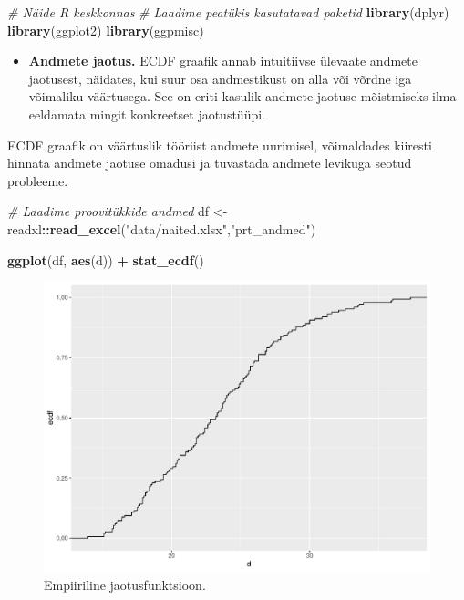 \documentclass[
]{book}
\newenvironment{Shaded}{\begin{snugshade}}{\end{snugshade}}
\newcommand{\CommentTok}[1]{\textcolor[rgb]{0.56,0.35,0.01}{\textit{#1}}}
\newcommand{\FunctionTok}[1]{\textcolor[rgb]{0.13,0.29,0.53}{\textbf{#1}}}
\newcommand{\NormalTok}[1]{#1}
\newcommand{\OtherTok}[1]{\textcolor[rgb]{0.56,0.35,0.01}{#1}}
\newcommand{\SpecialCharTok}[1]{\textcolor[rgb]{0.81,0.36,0.00}{\textbf{#1}}}
\newcommand{\StringTok}[1]{\textcolor[rgb]{0.31,0.60,0.02}{#1}}
\providecommand{\tightlist}{%
  \setlength{\itemsep}{0pt}\setlength{\parskip}{0pt}}
\renewenvironment{Shaded} {\begin{snugshade}\footnotesize} {\end{snugshade}}
\begin{document}
\begin{Shaded}
\begin{Highlighting}[]
\CommentTok{\# Näide R keskkonnas}
\CommentTok{\# Laadime peatükis kasutatavad paketid}
\FunctionTok{library}\NormalTok{(dplyr)}
\FunctionTok{library}\NormalTok{(ggplot2)}
\FunctionTok{library}\NormalTok{(ggpmisc)}
\end{Highlighting}
\end{Shaded}

\begin{itemize}
\tightlist
\item
  \textbf{Andmete jaotus.} ECDF graafik annab intuitiivse ülevaate andmete jaotusest, näidates, kui suur osa andmestikust on alla või võrdne iga võimaliku väärtusega. See on eriti kasulik andmete jaotuse mõistmiseks ilma eeldamata mingit konkreetset jaotustüüpi.
\end{itemize}

ECDF graafik on väärtuslik tööriist andmete uurimisel, võimaldades kiiresti hinnata andmete jaotuse omadusi ja tuvastada andmete levikuga seotud probleeme.

\begin{Shaded}
\begin{Highlighting}[]
\CommentTok{\# Laadime proovitükkide andmed}
\NormalTok{df }\OtherTok{\textless{}{-}}\NormalTok{ readxl}\SpecialCharTok{::}\FunctionTok{read\_excel}\NormalTok{(}\StringTok{"data/naited.xlsx"}\NormalTok{,}\StringTok{"prt\_andmed"}\NormalTok{)}

\FunctionTok{ggplot}\NormalTok{(df, }\FunctionTok{aes}\NormalTok{(d)) }\SpecialCharTok{+}
  \FunctionTok{stat\_ecdf}\NormalTok{()}
\end{Highlighting}
\end{Shaded}

\begin{figure}
\includegraphics[width=0.8\linewidth]{_main_files/figure-latex/unnamed-chunk-38-1} \caption{Empiiriline jaotusfunktsioon.}\label{fig:unnamed-chunk-38}
\end{figure}
\end{document}
